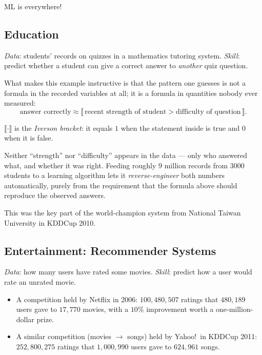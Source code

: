\begin{moral}
    ML is everywhere!
\end{moral}

\subsection{Education}

\emph{Data}: students' records on quizzes in a mathematics tutoring system.
\emph{Skill}: predict whether a student can give a correct answer to
\emph{another} quiz question.

What makes this example instructive is that the pattern one guesses is not a
formula in the recorded variables at all; it is a formula in quantities nobody
ever measured:
\[
    \text{answer correctly} \approx
    \llbracket\, \text{recent strength of student}
    > \text{difficulty of question} \,\rrbracket.
\]

\begin{notation}
    \(\llbracket \cdot \rrbracket\) is the \emph{Iverson bracket}: it equals
    \(1\) when the statement inside is true and \(0\) when it is false.
\end{notation}

Neither ``strength'' nor ``difficulty'' appears in the data --- only who
answered what, and whether it was right. Feeding roughly \(9\) million records
from \(3000\) students to a learning algorithm lets it
\emph{reverse-engineer} both numbers automatically, purely from the requirement
that the formula above should reproduce the observed answers.

\begin{moral}
    This was the key part of the world-champion system from National Taiwan
    University in KDDCup 2010.
\end{moral}

\subsection{Entertainment: Recommender Systems}

\emph{Data}: how many users have rated some movies.
\emph{Skill}: predict how a user would rate an unrated movie.

\begin{eg}
    \begin{itemize}
        \item A competition held by Netflix in 2006: \(100{,}480{,}507\) ratings
            that \(480{,}189\) users gave to \(17{,}770\) movies, with a
            \(10\%\) improvement worth a one-million-dollar prize.
        \item A similar competition (movies \(\to\) songs) held by Yahoo!\ in
            KDDCup 2011: \(252{,}800{,}275\) ratings that \(1{,}000{,}990\)
            users gave to \(624{,}961\) songs.
    \end{itemize}
\end{eg}

